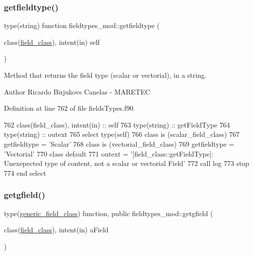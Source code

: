 \subsubsection{\texorpdfstring{getfieldtype()}{getfieldtype()}}
{\footnotesize\ttfamily type(string) function fieldtypes\+\_\+mod\+::getfieldtype (\begin{DoxyParamCaption}\item[{class(\mbox{\hyperlink{structfieldtypes__mod_1_1field__class}{field\+\_\+class}}), intent(in)}]{self }\end{DoxyParamCaption})\hspace{0.3cm}{\ttfamily [private]}}



Method that returns the field type (scalar or vectorial), in a string. 

\begin{DoxyAuthor}{Author}
Ricardo Birjukovs Canelas -\/ M\+A\+R\+E\+T\+EC 
\end{DoxyAuthor}


Definition at line 762 of file fields\+Types.\+f90.


\begin{DoxyCode}
762     \textcolor{keywordtype}{class}(field\_class), \textcolor{keywordtype}{intent(in)} :: self
763     \textcolor{keywordtype}{type}(string) :: getFieldType
764     \textcolor{keywordtype}{type}(string) :: outext
765     \textcolor{keywordflow}{select type}(self)
766 \textcolor{keywordflow}{    class is} (scalar\_field\_class)
767         getfieldtype = \textcolor{stringliteral}{'Scalar'}
768 \textcolor{keywordflow}{    class is} (vectorial\_field\_class)
769         getfieldtype = \textcolor{stringliteral}{'Vectorial'}
770 \textcolor{keywordflow}{        class default}
771         outext = \textcolor{stringliteral}{'[field\_class::getFieldType]: Unexepected type of content, not a scalar or vectorial
       Field'}
772         \textcolor{keyword}{call }log%
773         stop
774 \textcolor{keywordflow}{    end select}
\end{DoxyCode}
\mbox{\label{namespacefieldtypes__mod_a73c64e544ca15d30975aad5a35c2d904}} 
\subsubsection{\texorpdfstring{getgfield()}{getgfield()}}
{\footnotesize\ttfamily type(\mbox{\hyperlink{structfieldtypes__mod_1_1generic__field__class}{generic\+\_\+field\+\_\+class}}) function, public fieldtypes\+\_\+mod\+::getgfield (\begin{DoxyParamCaption}\item[{class(\mbox{\hyperlink{structfieldtypes__mod_1_1field__class}{field\+\_\+class}}), intent(in)}]{a\+Field }\end{DoxyParamCaption})}



